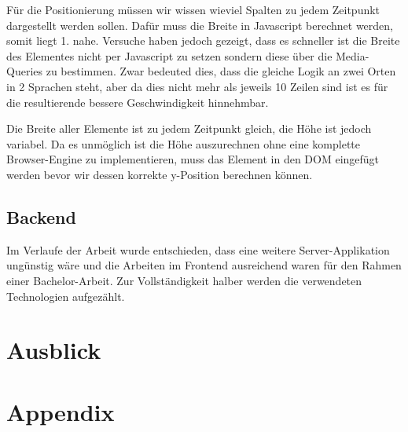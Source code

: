 \documentclass[12pt,twoside]{book}
\let\cleardoublepage\clearpage
\begin{document}
Für die Positionierung müssen wir wissen wieviel Spalten zu jedem Zeitpunkt dargestellt werden sollen. Dafür muss die Breite in Javascript berechnet werden, somit liegt 1. nahe. Versuche haben jedoch gezeigt, dass es schneller ist die Breite des Elementes nicht per Javascript zu setzen sondern diese über die Media-Queries zu bestimmen. Zwar bedeuted dies, dass die gleiche Logik an zwei Orten in 2 Sprachen steht, aber da dies nicht mehr als jeweils 10 Zeilen sind ist es für die resultierende bessere Geschwindigkeit hinnehmbar.

Die Breite aller Elemente ist zu jedem Zeitpunkt gleich, die Höhe ist jedoch variabel. Da es unmöglich ist die Höhe auszurechnen ohne eine komplette Browser-Engine zu implementieren, muss das Element in den DOM eingefügt werden bevor wir dessen korrekte y-Position berechnen können.


\section*{Backend}

Im Verlaufe der Arbeit wurde entschieden, dass eine weitere Server-Applikation ungünstig wäre und die Arbeiten im Frontend ausreichend waren für den Rahmen einer Bachelor-Arbeit.
Zur Vollständigkeit halber werden die verwendeten Technologien aufgezählt.


\chapter{Ausblick}

\chapter{Appendix}

\cleardoublepage
{}

\printbibliography

\cleardoublepage
{}
\end{document}
